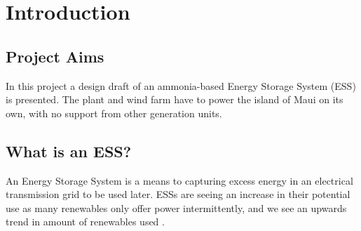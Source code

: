 

\section{Introduction}
\subsection{Project Aims}

In this project a design draft of an ammonia-based Energy Storage System (ESS) is presented.
The plant and wind farm have to power the island of Maui on its own, with no support from other generation units.


\subsection{What is an ESS?}

An Energy Storage System is a means to capturing excess energy in an electrical transmission grid to be used later.
ESSs are seeing an increase in their potential use as many renewables only offer power intermittently, and we see an upwards trend in amount of renewables used \cite{intro:growth}.


